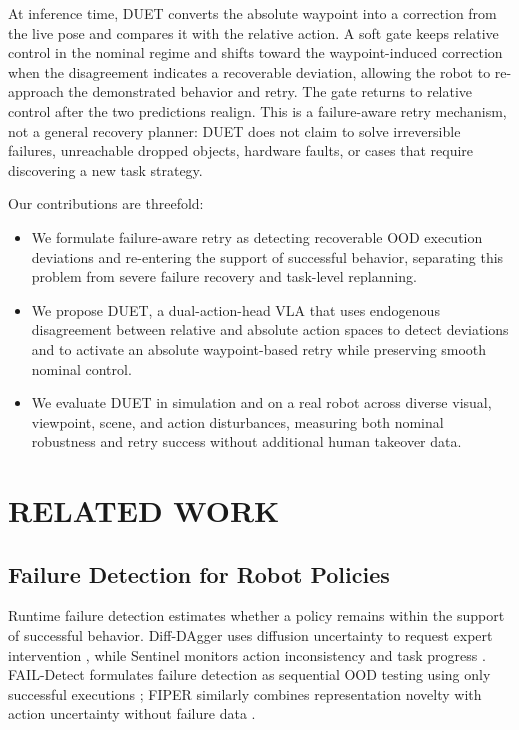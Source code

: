 \documentclass[letterpaper, 10 pt, conference]{ieeeconf}
\begin{document}
At inference time, DUET converts the absolute waypoint into a correction from the live pose and compares it with the relative action. A soft gate keeps relative control in the nominal regime and shifts toward the waypoint-induced correction when the disagreement indicates a recoverable deviation, allowing the robot to re-approach the demonstrated behavior and retry. The gate returns to relative control after the two predictions realign. This is a failure-aware retry mechanism, not a general recovery planner: DUET does not claim to solve irreversible failures, unreachable dropped objects, hardware faults, or cases that require discovering a new task strategy.

Our contributions are threefold:
\begin{itemize}
    \item We formulate failure-aware retry as detecting recoverable OOD execution deviations and re-entering the support of successful behavior, separating this problem from severe failure recovery and task-level replanning.
    \item We propose DUET, a dual-action-head VLA that uses endogenous disagreement between relative and absolute action spaces to detect deviations and to activate an absolute waypoint-based retry while preserving smooth nominal control.
    \item We evaluate DUET in simulation and on a real robot across diverse visual, viewpoint, scene, and action disturbances, measuring both nominal robustness and retry success without additional human takeover data.
\end{itemize}

\section{RELATED WORK}

\subsection{Failure Detection for Robot Policies}
Runtime failure detection estimates whether a policy remains within the support of successful behavior. Diff-DAgger uses diffusion uncertainty to request expert intervention \cite{diffdagger}, while Sentinel monitors action inconsistency and task progress \cite{sentinel}. FAIL-Detect formulates failure detection as sequential OOD testing using only successful executions \cite{faildetect}; FIPER similarly combines representation novelty with action uncertainty without failure data \cite{fiper}.
\end{document}
